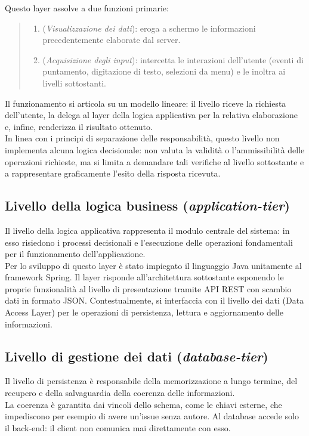 Questo layer assolve a due funzioni primarie:
\begin{quote}
\begin{enumerate}[label=\textit{\arabic*}]
   \item (\textit{Visualizzazione dei dati}): eroga a schermo le informazioni precedentemente elaborate dal server.
  
  \item (\textit{Acquisizione degli input}): intercetta le interazioni dell'utente (eventi di puntamento, digitazione di testo, selezioni da menu) e le inoltra ai livelli sottostanti. 
\end{enumerate} 
\end{quote}

Il funzionamento si articola su un modello lineare: il livello riceve la richiesta dell'utente, la delega al layer della logica applicativa per la relativa elaborazione e, infine, renderizza il risultato ottenuto. \\
\indent In linea con i principi di separazione delle responsabilità, questo livello non implementa alcuna logica decisionale: non valuta la validità o l'ammissibilità delle operazioni richieste, ma si limita a demandare tali verifiche al livello sottostante e a rappresentare graficamente l'esito della risposta ricevuta.

\subsection{Livello della logica business (\textit{application-tier})}
Il livello della logica applicativa rappresenta il modulo centrale del sistema: in esso risiedono i processi decisionali 
e l'esecuzione delle operazioni fondamentali per il funzionamento dell'applicazione. \\
\indent Per lo sviluppo di questo layer è stato impiegato il linguaggio Java unitamente al framework Spring.
Il layer risponde all'architettura sottostante esponendo le proprie 
funzionalità al livello di presentazione tramite API REST con scambio 
dati in formato JSON. Contestualmente, si interfaccia con il livello 
dei dati (Data Access Layer) per le operazioni di persistenza, lettura 
e aggiornamento delle informazioni.

\subsection{Livello di gestione dei dati (\textit{database-tier})}
Il livello di persistenza è responsabile della memorizzazione a lungo termine, 
del recupero e della salvaguardia della coerenza delle informazioni. \\
\indent La coerenza è garantita
dai vincoli dello schema, come le chiavi esterne, che impediscono per esempio di avere
un’issue senza autore. Al database accede solo il back-end: il client non comunica mai
direttamente con esso.

